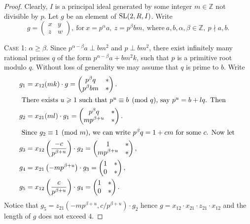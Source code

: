 \begin{proof}
Clearly, $I$ is a principal ideal generated by some integer $m\in\mathbb{Z}$ not divisible by $p$.
Let $g$ be an element of $\operatorname{SL}(2,R,I)$. Write
\[ g=\begin{pmatrix}x & y \\ z & w\end{pmatrix},\ \text{for}\ x=p^\alpha a,\ z=p^\beta bm,\ \text{where}\ a,b,\alpha,\beta\in\mathbb{Z},\ p\nmid a,b. \]

\textsc{Case 1:} $\alpha\geqslant\beta$. 
Since $p^{\alpha-\beta}a\perp bm^2$ and $p\perp bm^2$, there exist infinitely many rational primes $q$ of the form $p^{\alpha-\beta}a+bm^2k$,
such that $p$ is a primitive root modulo $q$. 
Without loss of generality we may assume that $q$ is prime to $b$. 
Write
\begin{align*}
g_1 & = x_{12}(mk)\cdot g =
\begin{pmatrix} p^\beta q & * \\ p^\beta bm & * \end{pmatrix}. \\
\intertext{
There exists $u\geqslant 1$ such that $p^u\equiv b\pmod q$, say $p^u=b+lq$. Then
}
g_2 & = x_{21}(ml)\cdot g_1 =
\begin{pmatrix} p^\beta q & * \\ mp^{\beta+u} & * \end{pmatrix}. \\
\intertext{
Since $g_2\equiv 1\pmod m$, we can write $p^\beta q=1+cm$ for some $c$. Now let
}
g_3 & = x_{12}\left(\dfrac{-c}{p^{\beta+u}}\right)\cdot g_2 =
\begin{pmatrix} 1 & * \\ mp^{\beta+u} & * \end{pmatrix}, \\
g_4 & = x_{21}\left(-mp^{\beta+u}\right)\cdot g_3 =
\begin{pmatrix} 1 & * \\ 0 & * \end{pmatrix}, \\
g_5 & = x_{12}\left(\dfrac{c}{p^{\beta+u}}\right)\cdot g_4 =
\begin{pmatrix} 1 & * \\ 0 & * \end{pmatrix}.
\end{align*}
Notice that $g_5=z_{21}\left(-mp^{\beta+u},c/p^{\beta+u}\right)\cdot g_2$ hence $g=x_{12} \cdot x_{21} \cdot z_{21} \cdot x_{12}$
and the length of $g$ does not exceed $4$.


\end{proof}
